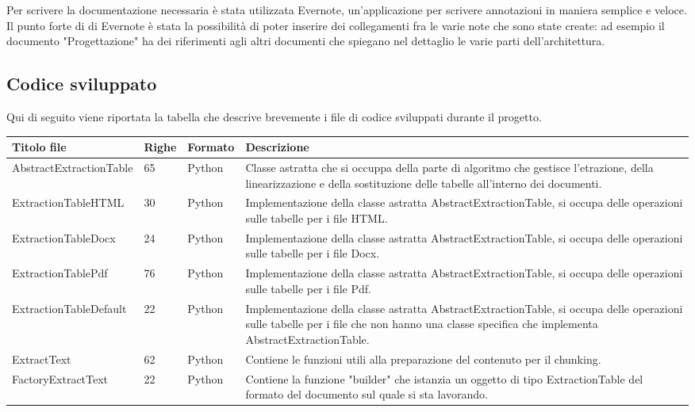 \noindent Per scrivere la documentazione necessaria è stata utilizzata Evernote, un'applicazione per scrivere annotazioni in maniera semplice e veloce.
Il punto forte di di Evernote è stata la possibilità di poter inserire dei collegamenti fra le varie note che sono state create: ad esempio  il documento "Progettazione" ha dei riferimenti agli altri documenti che spiegano nel dettaglio le varie parti dell'architettura.

\subsection{Codice sviluppato}
Qui di seguito viene riportata la tabella che descrive brevemente i file di codice sviluppati durante il progetto.
\begin{table}[H]
    \centering
    \begin{tabular}{|p{4cm} |p{1cm} | p{2cm} |p{6cm}|}
        \hline
        \textbf{Titolo file} & \textbf{Righe} & \textbf{Formato} & \textbf{Descrizione}\\
        \hline
        AbstractExtractionTable & 65 & Python & Classe astratta che si occuppa della parte di algoritmo che gestisce l'etrazione, della linearizzazione e della sostituzione delle tabelle all'interno dei documenti. \\
        \hline
        ExtractionTableHTML & 30 & Python & Implementazione della classe astratta AbstractExtractionTable, si occupa delle operazioni sulle tabelle per i file HTML. \\
        \hline
        ExtractionTableDocx & 24 & Python & Implementazione della classe astratta AbstractExtractionTable, si occupa delle operazioni sulle tabelle per i file Docx. \\
        \hline
        ExtractionTablePdf & 76 & Python & Implementazione della classe astratta AbstractExtractionTable, si occupa delle operazioni sulle tabelle per i file Pdf. \\
        \hline
        ExtractionTableDefault & 22 & Python & Implementazione della classe astratta AbstractExtractionTable, si occupa delle operazioni sulle tabelle per i file che non hanno una classe specifica che implementa AbstractExtractionTable. \\
        \hline
        ExtractText & 62 & Python & Contiene le funzioni utili alla preparazione del contenuto per il chunking. \\
        \hline
        FactoryExtractText & 22 & Python & Contiene la funzione "builder" che istanzia un oggetto di tipo ExtractionTable del formato del documento sul quale si sta lavorando. \\

\end{tabular}
\end{table}
